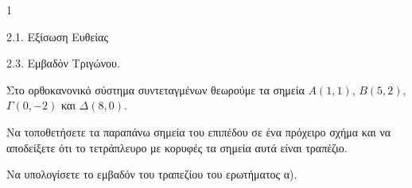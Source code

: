 \begin{ylh}{1}
    \item 2.1. Εξίσωση Ευθείας
    \item 2.3. Εμβαδόν Τριγώνου.
\end{ylh}
Στο ορθοκανονικό σύστημα συντεταγμένων θεωρούμε τα σημεία $A(1,1)$, $B(5,2)$, $\Gamma(0,-2)$ και $\Delta(8,0)$.
\begin{alist}
\item Να τοποθετήσετε τα παραπάνω σημεία του επιπέδου σε ένα πρόχειρο σχήμα και να αποδείξετε ότι το τετράπλευρο με κορυφές τα σημεία αυτά είναι τραπέζιο. 
\item Να υπολογίσετε το εμβαδόν του τραπεζίου του ερωτήματος α). 
\end{alist}
